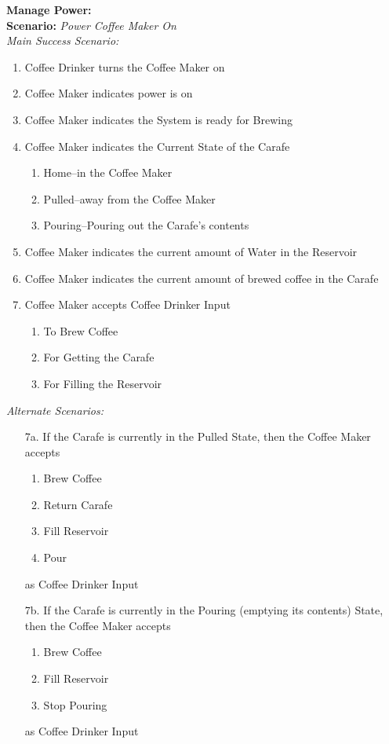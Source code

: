 \documentclass[letterpaper]{article}
\begin{document}
\noindent
\textbf{Manage Power: }\\
\textbf{Scenario:  }
\textit{Power Coffee Maker On}\\
\textit{Main Success Scenario:}
\begin{enumerate}
\item Coffee Drinker turns the Coffee Maker on
\item Coffee Maker indicates power is on
\item Coffee Maker indicates the System is ready for Brewing
\item Coffee Maker indicates the Current State of the Carafe
\begin{enumerate}
\item Home--in the Coffee Maker
\item Pulled--away from the Coffee Maker
\item Pouring--Pouring out the Carafe's contents
\end{enumerate}
\item Coffee Maker indicates the current amount of Water in the Reservoir
\item Coffee Maker indicates the current amount of brewed coffee in
the Carafe
\item Coffee Maker accepts Coffee Drinker Input
\begin{enumerate}
\item To Brew Coffee
\item For Getting the Carafe
\item For Filling the Reservoir
\end{enumerate} 
\end{enumerate}
\textit{Alternate Scenarios:}
\begin{enumerate}
\item[7a.] If the Carafe is currently in the Pulled State, then the
Coffee Maker accepts
\begin{enumerate}
\item Brew Coffee
\item Return Carafe
\item Fill Reservoir
\item Pour
\end{enumerate}
as Coffee Drinker Input
\item[7b.] If the Carafe is currently in the Pouring (emptying its 
contents) State, then the Coffee Maker accepts
\begin{enumerate}
\item Brew Coffee
\item Fill Reservoir
\item Stop Pouring
\end{enumerate}
as Coffee Drinker Input
\end{enumerate}
\end{document}
